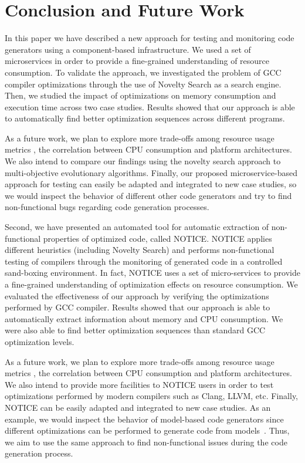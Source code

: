 \section{Conclusion and Future Work}

In this paper we have described a new approach for testing and monitoring code generators using a component-based infrastructure. 
We used a set of microservices in order to provide a fine-grained understanding of resource consumption. 
To validate the approach, we investigated the problem of GCC compiler optimizations through the use of Novelty Search as a search engine.  Then, we studied the impact of optimizations on memory consumption and execution time across two case studies. 
Results showed that our approach is able to automatically find better optimization sequences across different programs.

As a future work, we plan to explore more trade-offs among resource usage metrics \eg, the correlation between CPU consumption and platform architectures. 
We also intend to compare our findings using the novelty search approach to multi-objective evolutionary algorithms. 
Finally, our proposed microservice-based approach for testing can easily be adapted and integrated to new case studies, so we would inspect the behavior of different other code generators and try to find non-functional bugs regarding code generation processes.

 
 
Second, we have presented an automated tool for automatic extraction of non-functional properties of optimized code, called NOTICE. NOTICE applies different heuristics (including Novelty Search) and performs non-functional testing of compilers through the monitoring of generated code in a controlled sand-boxing environment. In fact, NOTICE uses a set of micro-services to provide a fine-grained understanding of optimization effects on resource consumption. 
We evaluated the effectiveness of our approach by verifying the optimizations performed by GCC compiler. 
Results showed that our approach is able to automatically extract information about memory and CPU consumption. We were also able to find better optimization sequences than standard GCC optimization levels.

As a future work, we plan to explore more trade-offs among resource usage metrics \eg, the correlation between CPU consumption and platform architectures. 
We also intend to provide more facilities to NOTICE users in order to test optimizations performed by modern compilers such as Clang, LLVM, etc.
Finally, NOTICE can be easily adapted and integrated to new case studies. As an example, we would inspect the behavior of model-based code generators since different optimizations can be performed to generate code from models~\cite{stuermer2007systematic}. Thus, we aim to use the same approach to find non-functional issues during the code generation process.



